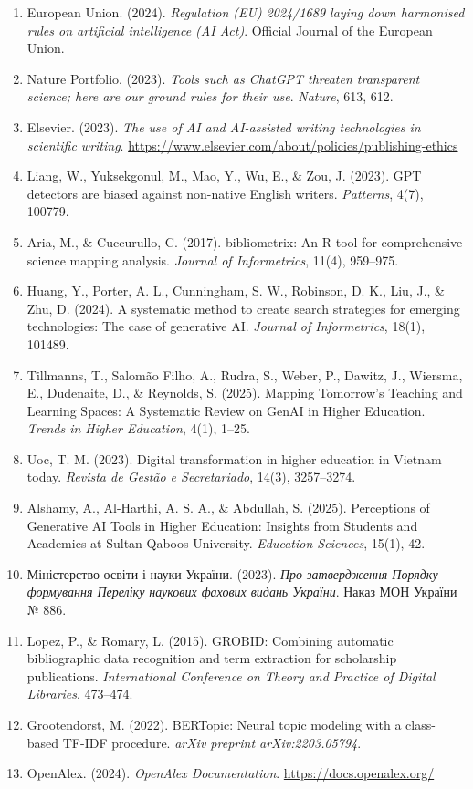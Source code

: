 \begin{enumerate}[leftmargin=*,itemsep=0.4em]
\item European Union. (2024). \textit{Regulation (EU) 2024/1689 laying down harmonised rules on artificial intelligence (AI Act)}. Official Journal of the European Union.
\item Nature Portfolio. (2023). \textit{Tools such as ChatGPT threaten transparent science; here are our ground rules for their use}. \textit{Nature}, 613, 612.
\item Elsevier. (2023). \textit{The use of AI and AI-assisted writing technologies in scientific writing}. \url{https://www.elsevier.com/about/policies/publishing-ethics}
\item Liang, W., Yuksekgonul, M., Mao, Y., Wu, E., \& Zou, J. (2023). GPT detectors are biased against non-native English writers. \textit{Patterns}, 4(7), 100779.
\item Aria, M., \& Cuccurullo, C. (2017). bibliometrix: An R-tool for comprehensive science mapping analysis. \textit{Journal of Informetrics}, 11(4), 959--975.
\item Huang, Y., Porter, A. L., Cunningham, S. W., Robinson, D. K., Liu, J., \& Zhu, D. (2024). A systematic method to create search strategies for emerging technologies: The case of generative AI. \textit{Journal of Informetrics}, 18(1), 101489.
\item Tillmanns, T., Salomão Filho, A., Rudra, S., Weber, P., Dawitz, J., Wiersma, E., Dudenaite, D., \& Reynolds, S. (2025). Mapping Tomorrow's Teaching and Learning Spaces: A Systematic Review on GenAI in Higher Education. \textit{Trends in Higher Education}, 4(1), 1--25.
\item Uoc, T. M. (2023). Digital transformation in higher education in Vietnam today. \textit{Revista de Gestão e Secretariado}, 14(3), 3257--3274.
\item Alshamy, A., Al-Harthi, A. S. A., \& Abdullah, S. (2025). Perceptions of Generative AI Tools in Higher Education: Insights from Students and Academics at Sultan Qaboos University. \textit{Education Sciences}, 15(1), 42.
\item Міністерство освіти і науки України. (2023). \textit{Про затвердження Порядку формування Переліку наукових фахових видань України}. Наказ МОН України № 886.
\item Lopez, P., \& Romary, L. (2015). GROBID: Combining automatic bibliographic data recognition and term extraction for scholarship publications. \textit{International Conference on Theory and Practice of Digital Libraries}, 473--474.
\item Grootendorst, M. (2022). BERTopic: Neural topic modeling with a class-based TF-IDF procedure. \textit{arXiv preprint arXiv:2203.05794}.
\item OpenAlex. (2024). \textit{OpenAlex Documentation}. \url{https://docs.openalex.org/}
\end{enumerate}
